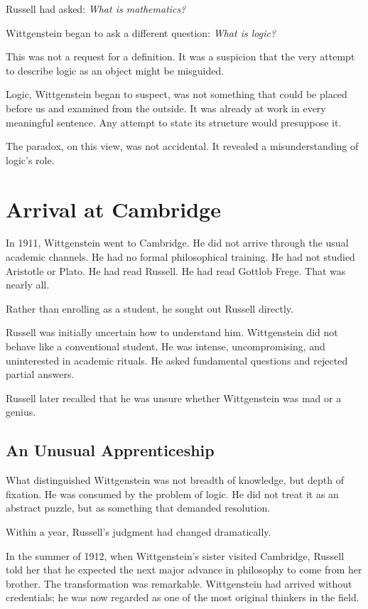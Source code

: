 \documentclass[11pt]{article}
\begin{document}
Russell had asked: \emph{What is mathematics?}

Wittgenstein began to ask a different question: \emph{What is logic?}

This was not a request for a definition. It was a suspicion that the very attempt to describe logic as an object might be misguided.

Logic, Wittgenstein began to suspect, was not something that could be placed before us and examined from the outside. It was already at work in every meaningful sentence. Any attempt to state its structure would presuppose it.

The paradox, on this view, was not accidental. It revealed a misunderstanding of logic’s role.

\section*{Arrival at Cambridge}

In 1911, Wittgenstein went to Cambridge. He did not arrive through the usual academic channels. He had no formal philosophical training. He had not studied Aristotle or Plato. He had read Russell. He had read Gottlob Frege. That was nearly all.

Rather than enrolling as a student, he sought out Russell directly.

Russell was initially uncertain how to understand him. Wittgenstein did not behave like a conventional student. He was intense, uncompromising, and uninterested in academic rituals. He asked fundamental questions and rejected partial answers.

Russell later recalled that he was unsure whether Wittgenstein was mad or a genius.

\subsection*{An Unusual Apprenticeship}

What distinguished Wittgenstein was not breadth of knowledge, but depth of fixation. He was consumed by the problem of logic. He did not treat it as an abstract puzzle, but as something that demanded resolution.

Within a year, Russell’s judgment had changed dramatically.

In the summer of 1912, when Wittgenstein’s sister visited Cambridge, Russell told her that he expected the next major advance in philosophy to come from her brother. The transformation was remarkable. Wittgenstein had arrived without credentials; he was now regarded as one of the most original thinkers in the field.
\end{document}
